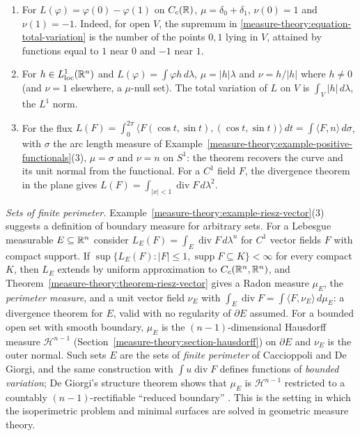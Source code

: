 \begin{example}\label{measure-theory:example-riesz-vector}
\begin{enumerate}
\item For $L(\varphi) = \varphi(0) - \varphi(1)$ on $C_c(\mathbb{R})$, $\mu = \delta_0 + \delta_1$, $\nu(0) = 1$ and $\nu(1) = -1$. Indeed, for open $V$, the supremum in
\eqref{measure-theory:equation-total-variation} is the number of the points $0, 1$ lying in $V$, attained by functions equal to $1$ near $0$ and $-1$ near $1$.
\item For $h \in L^1_{\mathrm{loc}}(\mathbb{R}^n)$ and $L(\varphi) = \int\varphi h\,d\lambda$, $\mu = |h|\lambda$ and $\nu = h/|h|$ where $h \neq 0$ (and $\nu = 1$ elsewhere, a $\mu$-null set). The total variation of
$L$ on $V$ is $\int_V|h|\,d\lambda$, the $L^1$ norm.
\item For the flux $L(F) = \int_0^{2\pi}\langle F(\cos t, \sin t), (\cos t, \sin t)\rangle\,dt = \int\langle F, n\rangle\,d\sigma$, with $\sigma$ the arc length measure of
Example~\ref{measure-theory:example-positive-functionals}(3), $\mu = \sigma$ and $\nu = n$ on $S^1$: the theorem recovers the curve and its unit normal from the functional.
For a $C^1$ field $F$, the divergence theorem in the plane gives $L(F) = \int_{|x| < 1}\operatorname{div}F\,d\lambda^2$.
\end{enumerate}
\end{example}

\begin{remark}\label{measure-theory:remark-perimeter}
\emph{Sets of finite perimeter.} Example~\ref{measure-theory:example-riesz-vector}(3) suggests a definition of boundary measure for arbitrary sets. For a Lebesgue measurable $E \subseteq \mathbb{R}^n$ consider
$L_E(F) = \int_E\operatorname{div}F\,d\lambda^n$ for $C^1$ vector fields $F$ with compact support. If $\sup\{L_E(F) : |F| \leq 1, \operatorname{supp}F \subseteq K\} < \infty$ for every compact $K$, then $L_E$ extends
by uniform approximation to $C_c(\mathbb{R}^n, \mathbb{R}^n)$, and Theorem~\ref{measure-theory:theorem-riesz-vector} gives a Radon measure $\mu_E$, the \emph{perimeter measure}, and a unit vector field $\nu_E$ with
$\int_E\operatorname{div}F = \int\langle F, \nu_E\rangle\,d\mu_E$: a divergence theorem for $E$, valid with no regularity of $\partial E$ assumed. For a bounded open set with smooth boundary, $\mu_E$ is the
$(n-1)$-dimensional Hausdorff measure $\mathcal{H}^{n-1}$ (Section~\ref{measure-theory:section-hausdorff}) on $\partial E$ and $\nu_E$ is the outer normal. Such sets $E$ are the sets of \emph{finite perimeter} of Caccioppoli and De Giorgi, and the same construction with $\int u\operatorname{div}F$
defines functions of \emph{bounded variation}; De Giorgi's structure theorem shows that $\mu_E$ is $\mathcal{H}^{n-1}$ restricted to a countably $(n-1)$-rectifiable ``reduced boundary''
\cite[Chapter 5]{evans-gariepy}. This is the setting in which the isoperimetric problem and minimal surfaces are solved in geometric measure theory.
\end{remark}

